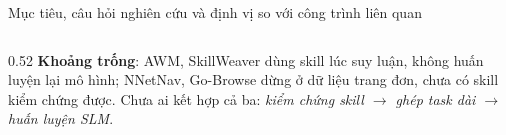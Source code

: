 \begin{frame}{Mục tiêu, câu hỏi nghiên cứu và định vị so với công trình liên quan}
\begin{columns}[t]
\begin{column}{0.52\textwidth}
      \vspace{0.08cm}
      \scriptsize
      \textbf{Khoảng trống}: AWM, SkillWeaver dùng skill lúc suy luận, không huấn
      luyện lại mô hình; NNetNav, Go-Browse dừng ở dữ liệu trang đơn, chưa có skill
      kiểm chứng được. Chưa ai kết hợp cả ba: \textit{kiểm chứng skill $\rightarrow$
      ghép task dài $\rightarrow$ huấn luyện SLM}.
    \end{column}
  \end{columns}
\end{frame}
